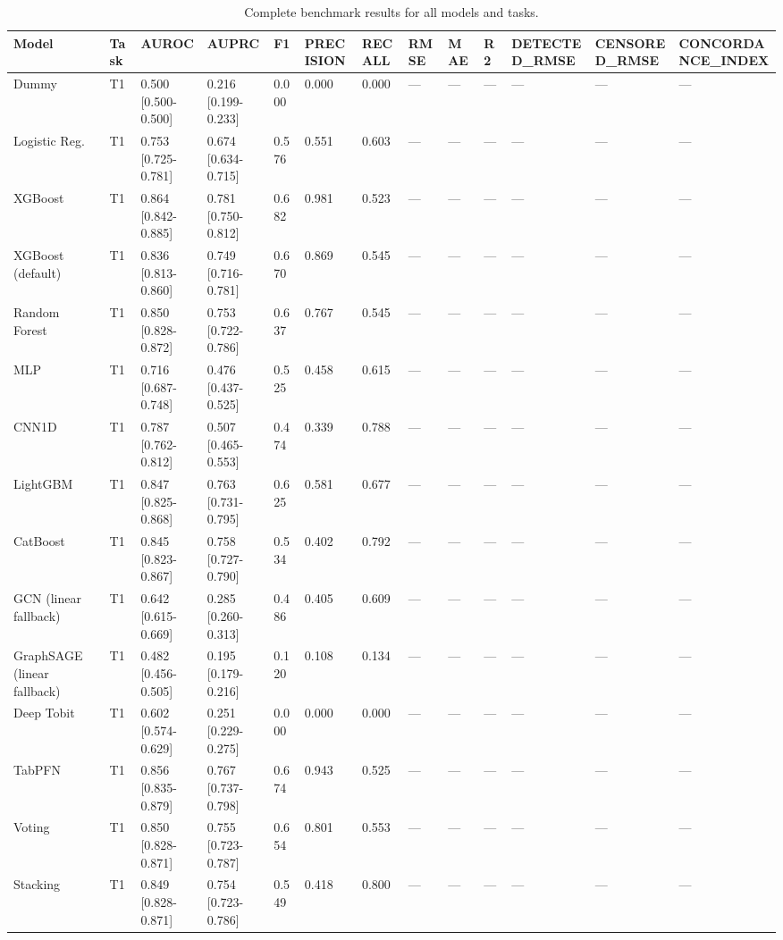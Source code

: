 \begin{table}
\caption{Complete benchmark results for all models and tasks.}
\label{tab:supp-benchmark-full}
\begin{tabular}{lllllllllllll}
\toprule
Model & Task & AUROC & AUPRC & F1 & PRECISION & RECALL & RMSE & MAE & R2 & DETECTED_RMSE & CENSORED_RMSE & CONCORDANCE_INDEX \\
\midrule
Dummy & T1 & 0.500 [0.500-0.500] & 0.216 [0.199-0.233] & 0.000 & 0.000 & 0.000 & — & — & — & — & — & — \\
Logistic Reg. & T1 & 0.753 [0.725-0.781] & 0.674 [0.634-0.715] & 0.576 & 0.551 & 0.603 & — & — & — & — & — & — \\
XGBoost & T1 & 0.864 [0.842-0.885] & 0.781 [0.750-0.812] & 0.682 & 0.981 & 0.523 & — & — & — & — & — & — \\
XGBoost (default) & T1 & 0.836 [0.813-0.860] & 0.749 [0.716-0.781] & 0.670 & 0.869 & 0.545 & — & — & — & — & — & — \\
Random Forest & T1 & 0.850 [0.828-0.872] & 0.753 [0.722-0.786] & 0.637 & 0.767 & 0.545 & — & — & — & — & — & — \\
MLP & T1 & 0.716 [0.687-0.748] & 0.476 [0.437-0.525] & 0.525 & 0.458 & 0.615 & — & — & — & — & — & — \\
CNN1D & T1 & 0.787 [0.762-0.812] & 0.507 [0.465-0.553] & 0.474 & 0.339 & 0.788 & — & — & — & — & — & — \\
LightGBM & T1 & 0.847 [0.825-0.868] & 0.763 [0.731-0.795] & 0.625 & 0.581 & 0.677 & — & — & — & — & — & — \\
CatBoost & T1 & 0.845 [0.823-0.867] & 0.758 [0.727-0.790] & 0.534 & 0.402 & 0.792 & — & — & — & — & — & — \\
GCN (linear fallback) & T1 & 0.642 [0.615-0.669] & 0.285 [0.260-0.313] & 0.486 & 0.405 & 0.609 & — & — & — & — & — & — \\
GraphSAGE (linear fallback) & T1 & 0.482 [0.456-0.505] & 0.195 [0.179-0.216] & 0.120 & 0.108 & 0.134 & — & — & — & — & — & — \\
Deep Tobit & T1 & 0.602 [0.574-0.629] & 0.251 [0.229-0.275] & 0.000 & 0.000 & 0.000 & — & — & — & — & — & — \\
TabPFN & T1 & 0.856 [0.835-0.879] & 0.767 [0.737-0.798] & 0.674 & 0.943 & 0.525 & — & — & — & — & — & — \\
Voting & T1 & 0.850 [0.828-0.871] & 0.755 [0.723-0.787] & 0.654 & 0.801 & 0.553 & — & — & — & — & — & — \\
Stacking & T1 & 0.849 [0.828-0.871] & 0.754 [0.723-0.786] & 0.549 & 0.418 & 0.800 & — & — & — & — & — & — \\

\end{tabular}
\end{table}
